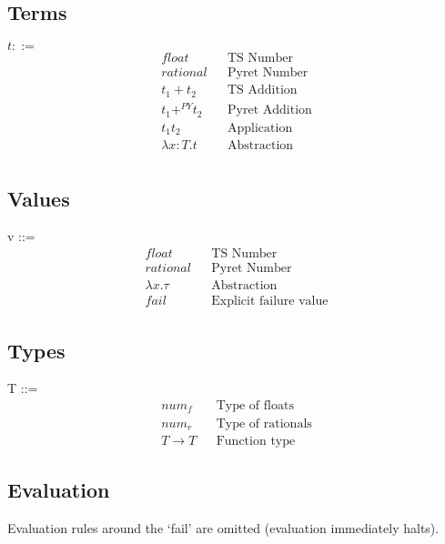 \documentclass{article}
\begin{document}
	\subsection{Terms}
	$t ::=$
	\begin{align*}
		float 		  								&& \text{TS Number} \\
		rational	  								&& \text{Pyret Number} \\
		t_1 + t_2 									&& \text{TS Addition} \\
		t_1 +^{PY} t_2 								&& \text{Pyret Addition} \\
		t_1 t_2 							    	&& \text{Application} \\
		\lambda x\colon T. t					    && \text{Abstraction} \\
	\end{align*}


	\subsection{Values}
	v ::=
	\begin{align*}
		float						&& \text{TS Number} \\
		rational					&& \text{Pyret Number}\\
		\lambda x. \tau		    	&& \text{Abstraction} \\
		fail						&& \text{Explicit failure value}
	\end{align*}


	\subsection{Types}
	T ::=
	\begin{align*}
		num_f				&& \text{Type of floats}\\
		num_r				&& \text{Type of rationals}\\
		T \rightarrow T		&& \text{Function type}
	\end{align*}
	
	
	\subsection{Evaluation}
	
	Evaluation rules around the `fail' are omitted (evaluation immediately halts).\\
	
\end{document}

